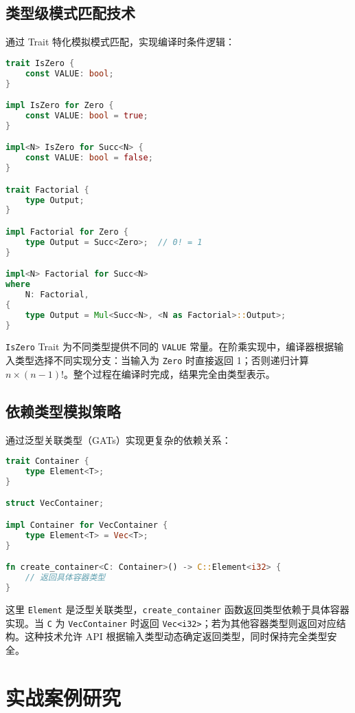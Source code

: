 \section{类型级模式匹配技术}
通过 Trait 特化模拟模式匹配，实现编译时条件逻辑：\par
\begin{lstlisting}[language=rust]
trait IsZero {
    const VALUE: bool;
}

impl IsZero for Zero {
    const VALUE: bool = true;
}

impl<N> IsZero for Succ<N> {
    const VALUE: bool = false;
}

trait Factorial {
    type Output;
}

impl Factorial for Zero {
    type Output = Succ<Zero>;  // 0! = 1
}

impl<N> Factorial for Succ<N>
where
    N: Factorial,
{
    type Output = Mul<Succ<N>, <N as Factorial>::Output>;
}
\end{lstlisting}
\texttt{IsZero} Trait 为不同类型提供不同的 \texttt{VALUE} 常量。在阶乘实现中，编译器根据输入类型选择不同实现分支：当输入为 \texttt{Zero} 时直接返回 1；否则递归计算 $n \times (n-1)!$。整个过程在编译时完成，结果完全由类型表示。\par
\section{依赖类型模拟策略}
通过泛型关联类型（GATs）实现更复杂的依赖关系：\par
\begin{lstlisting}[language=rust]
trait Container {
    type Element<T>;
}

struct VecContainer;

impl Container for VecContainer {
    type Element<T> = Vec<T>;
}

fn create_container<C: Container>() -> C::Element<i32> {
    // 返回具体容器类型
}
\end{lstlisting}
这里 \texttt{Element} 是泛型关联类型，\texttt{create\_{}container} 函数返回类型依赖于具体容器实现。当 \texttt{C} 为 \texttt{VecContainer} 时返回 \texttt{Vec<i32>}；若为其他容器类型则返回对应结构。这种技术允许 API 根据输入类型动态确定返回类型，同时保持完全类型安全。\par
\chapter{实战案例研究}
